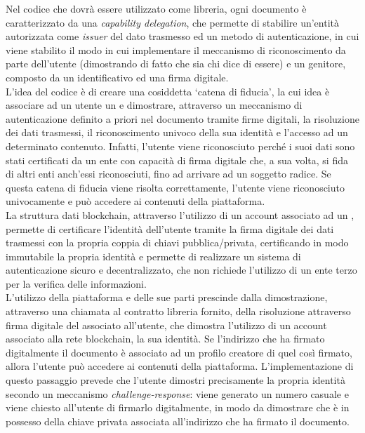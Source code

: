 \newpage

Nel codice che dovrà essere utilizzato come libreria,
ogni documento è caratterizzato da una \textit{capability delegation}, che permette di stabilire un'entità autorizzata come \textit{issuer} del dato trasmesso ed 
un metodo di autenticazione, in cui viene stabilito il modo in cui implementare il meccanismo di riconoscimento da parte dell'utente (dimostrando di fatto che sia chi dice di essere) e un 
genitore, composto da un identificativo ed una firma digitale. \\

L'idea del codice è di creare una cosiddetta `catena di fiducia', la cui idea è associare ad un utente un  e dimostrare,
attraverso un meccanismo di autenticazione definito a priori nel documento tramite firme digitali, la risoluzione dei dati trasmessi, il riconoscimento univoco della sua identità
e l'accesso ad un determinato contenuto. Infatti, l'utente viene riconosciuto perché i suoi dati sono stati certificati da un ente 
con capacità di firma digitale che, a sua volta, si fida di altri enti anch'essi riconosciuti, fino ad arrivare ad un soggetto radice.
Se questa catena di fiducia viene risolta correttamente, l'utente viene riconosciuto univocamente e può accedere ai contenuti della piattaforma. \\

La struttura dati blockchain, attraverso l'utilizzo di un account associato ad un , permette di certificare l'identità dell'utente
tramite la firma digitale dei dati trasmessi con la propria coppia di chiavi pubblica/privata, certificando in modo immutabile la propria identità e
permette di realizzare un sistema di autenticazione sicuro e decentralizzato, che non richiede l'utilizzo di un ente terzo per la verifica delle informazioni. \\

L'utilizzo della piattaforma e delle sue parti prescinde dalla dimostrazione, attraverso una chiamata al contratto libreria fornito, della risoluzione attraverso firma digitale
del  associato all'utente, che dimostra l'utilizzo di un account associato alla rete blockchain,
la sua identità. Se l'indirizzo che ha firmato digitalmente il documento è associato ad un profilo creatore di quel  così firmato,
allora l'utente può accedere ai contenuti della piattaforma. L'implementazione di questo passaggio prevede che l'utente dimostri precisamente
la propria identità secondo un meccanismo \textit{challenge-response}: viene generato un numero casuale e viene chiesto all'utente di firmarlo digitalmente, in modo da dimostrare
che è in possesso della chiave privata associata all'indirizzo che ha firmato il documento. \\

